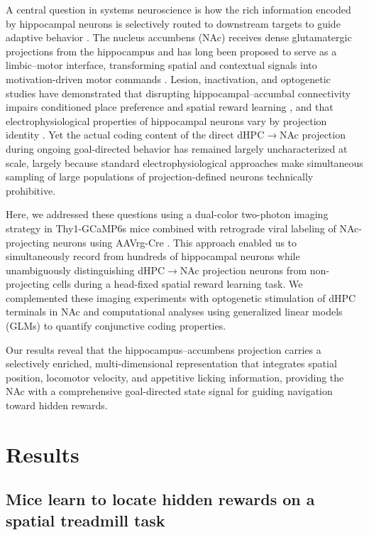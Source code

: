 \documentclass[11pt]{article}
\begin{document}
A central question in systems neuroscience is how the rich information encoded by hippocampal neurons is selectively routed to downstream targets to guide adaptive behavior \citep{ciocchi2015selective,xu2016ventral}. The nucleus accumbens (NAc) receives dense glutamatergic projections from the hippocampus and has long been proposed to serve as a limbic--motor interface, transforming spatial and contextual signals into motivation-driven motor commands \citep{mogenson1980motivation,floresco2015nucleus,britt2012synaptic}. Lesion, inactivation, and optogenetic studies have demonstrated that disrupting hippocampal--accumbal connectivity impairs conditioned place preference and spatial reward learning \citep{ito2008functional,legates2018distinct,trouche2019hippocampus}, and that electrophysiological properties of hippocampal neurons vary by projection identity \citep{ciocchi2015selective}. Yet the actual coding content of the direct dHPC$\to$NAc projection during ongoing goal-directed behavior has remained largely uncharacterized at scale, largely because standard electrophysiological approaches make simultaneous sampling of large populations of projection-defined neurons technically prohibitive.

Here, we addressed these questions using a dual-color two-photon imaging strategy in Thy1-GCaMP6s mice \citep{dana2014thy1,chen2013ultrasensitive} combined with retrograde viral labeling of NAc-projecting neurons using AAVrg-Cre \citep{tervo2016designer}. This approach enabled us to simultaneously record from hundreds of hippocampal neurons while unambiguously distinguishing dHPC$\to$NAc projection neurons from non-projecting cells during a head-fixed spatial reward learning task. We complemented these imaging experiments with optogenetic stimulation of dHPC terminals in NAc and computational analyses using generalized linear models (GLMs) to quantify conjunctive coding properties.

Our results reveal that the hippocampus--accumbens projection carries a selectively enriched, multi-dimensional representation that integrates spatial position, locomotor velocity, and appetitive licking information, providing the NAc with a comprehensive goal-directed state signal for guiding navigation toward hidden rewards.

\section{Results}

\subsection{Mice learn to locate hidden rewards on a spatial treadmill task}
\end{document}
